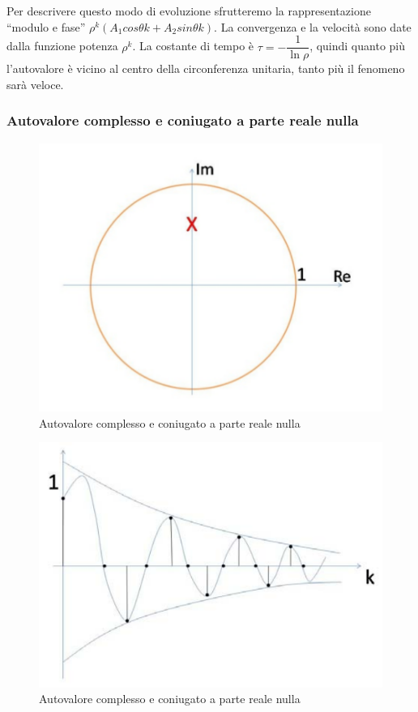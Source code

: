 \documentclass[a4paper]{report}
\begin{document}
Per descrivere questo modo di evoluzione sfrutteremo la
rappresentazione ``modulo e fase'' $\rho^k (A_1 cos \theta k +
A_2 sin \theta k)$. La convergenza e la velocit\`a sono date
dalla funzione potenza $\rho^k$. La costante di tempo \`e $\tau
= - \dfrac{1}{\ln \rho}$, quindi quanto pi\`u l'autovalore \`e
vicino al centro della circonferenza unitaria, tanto pi\`u il
fenomeno sar\`a veloce.

\subsubsection{Autovalore complesso e coniugato a parte reale nulla}
\begin{figure}[!h]
  \begin{center}
    \includegraphics[scale=0.3]{./figures/autovaloreComplessoConiugatoRealeNulla00.png}
    \caption{Autovalore complesso e coniugato a parte reale
      nulla}\label{fig:autovaloreComplessoConiugatoRealeNulla00.png}
  \end{center}
\end{figure}
\begin{figure}[!h]
  \begin{center}
    \includegraphics[scale=0.3]{./figures/autovaloreComplessoConiugatoRealeNulla01.png}
    \caption{Autovalore complesso e coniugato a parte reale
      nulla}\label{fig:autovaloreComplessoConiugatoRealeNulla01.png}
  \end{center}
\end{figure}
\end{document}
